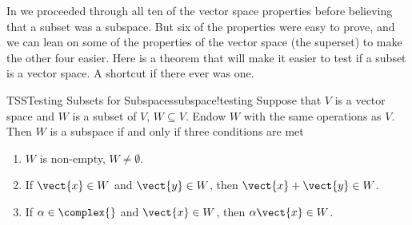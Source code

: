 %
%
In  we proceeded through all ten of the vector space properties before believing that a subset was a subspace.  But six of the properties were easy to prove, and we can lean on some of the properties of the vector space (the superset) to make the other four easier.  Here is a theorem that will make it easier to test if a subset is a vector space.  A shortcut if there ever was one.
%
\begin{theorem}{TSS}{Testing Subsets for Subspaces}{subspace!testing}
Suppose that $V$ is a vector space and $W$ is a subset of $V$, $W\subseteq V$.  Endow $W$ with the same operations as $V$.  Then $W$ is a subspace if and only if three conditions are met
%
\begin{enumerate}
\item $W$ is non-empty, $W\neq\emptyset$.
\item If $\vect{x}\in W$ and $\vect{y}\in W$, then $\vect{x}+\vect{y}\in W$.
%
\item If $\alpha\in\complex{\null}$ and $\vect{x}\in W$, then $\alpha\vect{x}\in W$.
%
\end{enumerate}
\end{theorem}
%
